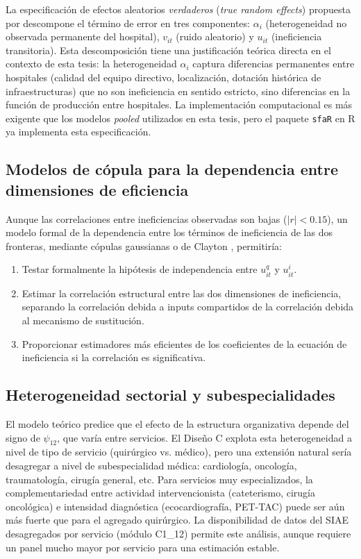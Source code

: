 \documentclass[12pt, a4paper, twoside, openright]{book}
\theoremstyle{plain}
\theoremstyle{definition}
\theoremstyle{remark}
\begin{document}
La especificación de efectos aleatorios \textit{verdaderos} (\textit{true random effects}) propuesta por \citet{greene2005a} descompone el término de error en tres componentes: $\alpha_i$ (heterogeneidad no observada permanente del hospital), $v_{it}$ (ruido aleatorio) y $u_{it}$ (ineficiencia transitoria). Esta descomposición tiene una justificación teórica directa en el contexto de esta tesis: la heterogeneidad $\alpha_i$ captura diferencias permanentes entre hospitales (calidad del equipo directivo, localización, dotación histórica de infraestructuras) que no son ineficiencia en sentido estricto, sino diferencias en la función de producción entre hospitales. La implementación computacional es más exigente que los modelos \textit{pooled} utilizados en esta tesis, pero el paquete \texttt{sfaR} en R ya implementa esta especificación.

\subsection{Modelos de cópula para la dependencia entre dimensiones de eficiencia}

Aunque las correlaciones entre ineficiencias observadas son bajas ($|r|<0.15$), un modelo formal de la dependencia entre los términos de ineficiencia de las dos fronteras, mediante cópulas gaussianas o de Clayton \citep{kumbhakar1997}, permitiría:

\begin{enumerate}[label=(\roman*)]
  \item Testar formalmente la hipótesis de independencia entre $u^q_{it}$ y $u^i_{it}$.
  \item Estimar la correlación estructural entre las dos dimensiones de ineficiencia, separando la correlación debida a inputs compartidos de la correlación debida al mecanismo de sustitución.
  \item Proporcionar estimadores más eficientes de los coeficientes de la ecuación de ineficiencia si la correlación es significativa.
\end{enumerate}

\subsection{Heterogeneidad sectorial y subespecialidades}

El modelo teórico predice que el efecto de la estructura organizativa depende del signo de $\psi_{12}$, que varía entre servicios. El Diseño C explota esta heterogeneidad a nivel de tipo de servicio (quirúrgico vs. médico), pero una extensión natural sería desagregar a nivel de subespecialidad médica: cardiología, oncología, traumatología, cirugía general, etc. Para servicios muy especializados, la complementariedad entre actividad intervencionista (cateterismo, cirugía oncológica) e intensidad diagnóstica (ecocardiografía, PET-TAC) puede ser aún más fuerte que para el agregado quirúrgico. La disponibilidad de datos del SIAE desagregados por servicio (módulo C1\_12) permite este análisis, aunque requiere un panel mucho mayor por servicio para una estimación estable.
\end{document}
